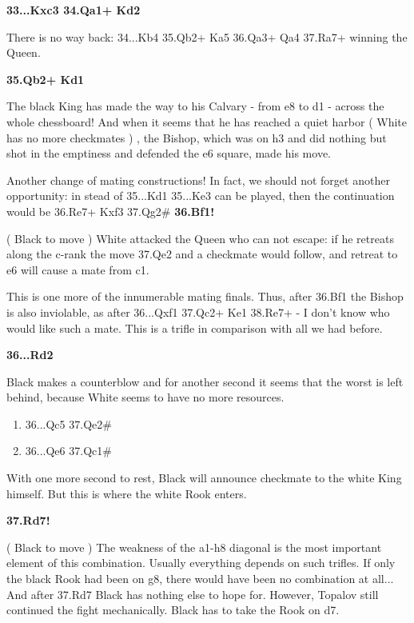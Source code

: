 \documentclass[
	11pt,twocolumn]{article}
\renewcommand{\bf}{\bfseries}
\begin{document}
{\bf 33...Kxc3 34.Qa1+ Kd2 }

There is no way back: 34...Kb4 35.Qb2+ Ka5 36.Qa3+ Qa4 37.Ra7+ winning the Queen. 

{\bf 35.Qb2+ Kd1 }

The black King has made the way to his Calvary - from e8 to d1 - across the whole chessboard! And when it seems that he has reached a quiet harbor ( White has no more checkmates ) , the Bishop, which was on h3 and did nothing but shot in the emptiness and defended the e6 square, made his move.



Another change of mating constructions! In fact, we should not forget another opportunity: in stead of 35...Kd1 35...Ke3  can be played, then the continuation would be 36.Re7+ Kxf3 37.Qg2\# 
{\bf 36.Bf1! }

( Black to move ) White attacked the Queen who can not escape: if he retreats along the c-rank the move 37.Qe2 and a checkmate would follow, and retreat to e6 will cause a mate from c1.



This is one more of the innumerable mating finals. Thus, after 36.Bf1  the Bishop is also inviolable, as after 36...Qxf1 37.Qc2+ Ke1 38.Re7+ - I don't know who would like such a mate. This is a trifle in comparison with all we had before. 

{\bf 36...Rd2 }

Black makes a counterblow and for another second it seems that the worst is left behind, because White seems to have no more resources.



\begin{enumerate}
\item
36...Qc5 37.Qe2\# 
\item
36...Qe6 37.Qc1\# \end{enumerate}



With one more second to rest, Black will announce checkmate to the white King himself. But this is where the white Rook enters.

{\bf 37.Rd7! }

( Black to move ) The weakness of the a1-h8 diagonal is the most important element of this combination. Usually everything depends on such trifles. If only the black Rook had been on g8, there would have been no combination at all... And after 37.Rd7 Black has nothing else to hope for. However, Topalov still continued the fight mechanically. Black has to take the Rook on d7.
\end{document}

